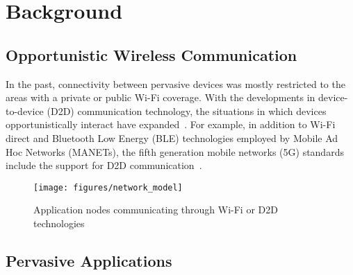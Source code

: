 \section{Background}\label{sec:background}


\subsection{Opportunistic Wireless Communication}


In the past, connectivity between pervasive devices was mostly restricted to the areas with a private or public Wi-Fi coverage. With the developments in device-to-device (D2D) communication technology, the situations in which devices opportunistically interact have expanded~\cite{Pelusi:2006}. For example, in addition to Wi-Fi direct and Bluetooth Low Energy (BLE) technologies employed by Mobile Ad Hoc Networks (MANETs), the fifth generation mobile networks (5G) standards include the support for D2D communication~\cite{Tehrani:2014}. 


\begin{figure*}[t!]
	\centering
	\texttt{[image: figures/network\_model]}
	\caption{Application nodes communicating through Wi-Fi or D2D technologies}
	\label{fig:network_model}
\end{figure*}


\subsection{Pervasive Applications}~\label{sec:characterization}

